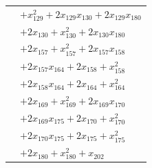 \begin{longtable}{@{}r@{\;}l@{}}
 & \(\displaystyle +x_{129}^{2} +2x_{129}x_{130} +2x_{129}x_{180}\) \\
 & \(\displaystyle +2x_{130} +x_{130}^{2} +2x_{130}x_{180}\) \\
 & \(\displaystyle +2x_{157} +x_{157}^{2} +2x_{157}x_{158}\) \\
 & \(\displaystyle +2x_{157}x_{164} +2x_{158} +x_{158}^{2}\) \\
 & \(\displaystyle +2x_{158}x_{164} +2x_{164} +x_{164}^{2}\) \\
 & \(\displaystyle +2x_{169} +x_{169}^{2} +2x_{169}x_{170}\) \\
 & \(\displaystyle +2x_{169}x_{175} +2x_{170} +x_{170}^{2}\) \\
 & \(\displaystyle +2x_{170}x_{175} +2x_{175} +x_{175}^{2}\) \\
 & \(\displaystyle +2x_{180} +x_{180}^{2} +x_{202}\) \\[3pt]
\end{longtable}
\endgroup
